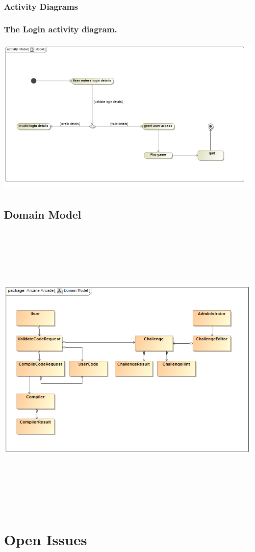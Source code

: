 \documentclass[english]{article}
\begin{document}
		\subsubsection{Activity Diagrams}		
		
		\subsubsection* {The Login activity diagram.}
		\includegraphics[width=14cm,height=8cm,keepaspectratio]{model.jpg}		
		
		
		\subsection{Domain Model}
			\includegraphics[width=15cm,height=15cm,keepaspectratio]{domainModel.png}
		

	\newpage
	\section{Open Issues}		


		
\end{document}
